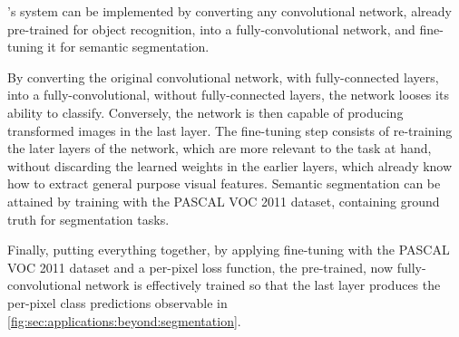 \citeauthor{Long2015}'s system can be implemented by converting any convolutional network, already pre-trained for object recognition, into a fully-convolutional network, and fine-tuning it for semantic segmentation.

By converting the original convolutional network, with fully-connected layers, into a fully-convolutional, without fully-connected layers, the network looses its ability to classify.
Conversely, the network is then capable of producing transformed images in the last layer.
The fine-tuning step consists of re-training the later layers of the network, which are more relevant to the task at hand, without discarding the learned weights in the earlier layers, which already know how to extract general purpose visual features.
Semantic segmentation can be attained by training with the PASCAL VOC 2011 dataset, containing ground truth for segmentation tasks.

Finally, putting everything together, by applying fine-tuning with the PASCAL VOC 2011 dataset and a per-pixel loss function, the pre-trained, now fully-convolutional network is effectively trained so that the last layer produces the per-pixel class predictions observable in \autoref{fig:sec:applications:beyond:segmentation}.
